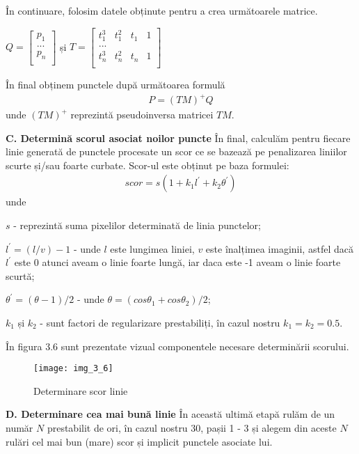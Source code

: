 În continuare, folosim datele obținute pentru a crea următoarele matrice.
\begin{center}
	$ Q = 
	\begin{bmatrix}
	p_1 \\
	... \\
	p_n \\
	\end{bmatrix}
	$ și $ T = 
	\begin{bmatrix}
	t_1^3 & t_1^2 & t_1 & 1 \\
	...\\
	t_n^3 & t_n^2 & t_n & 1\\
	\end{bmatrix}
	$
\end{center}

În final obținem punctele după următoarea formulă
\begin{align}
	P = (TM)^+Q
\end{align}
unde $(TM)^+$ reprezintă pseudoinversa matricei $TM$.

\textbf{C. Determină scorul asociat noilor puncte}
În final, calculăm pentru fiecare linie generată de punctele procesate un scor ce se bazează pe penalizarea liniilor scurte și/sau foarte curbate. Scor-ul este obținut pe baza formulei:
\begin{align}
	scor = s(1 + k_1l^{'}+k_2\theta^{'})
\end{align}
unde

$s$ - reprezintă suma pixelilor determinată de linia punctelor;

$l^{'} = (l/v) - 1$ - unde $l$ este lungimea liniei, $v$ este înalțimea imaginii, astfel dacă $l^{'}$ este 0 atunci aveam o linie foarte lungă, iar daca este -1 aveam o linie foarte scurtă;

$\theta^{'} = (\theta - 1)/2$ - unde $\theta = (cos\theta_1 + cos\theta_2)/2$;

$k_1$ și $k_2$ - sunt factori de regularizare prestabiliți, în cazul nostru $k_1 = k_2 = 0.5$.

În figura 3.6 sunt prezentate vizual componentele necesare determinării scorului.
\begin{figure}[!h]
	\centering
	\texttt{[image: img\_3\_6]}
	\caption{Determinare scor linie}
\end{figure}

\textbf{D. Determinare cea mai bună linie}
În această ultimă etapă rulăm de un număr $N$ prestabilit de ori, în cazul nostru 30, pașii 1 - 3 și alegem din aceste $N$ rulări cel mai bun (mare) scor și implicit punctele asociate lui.

